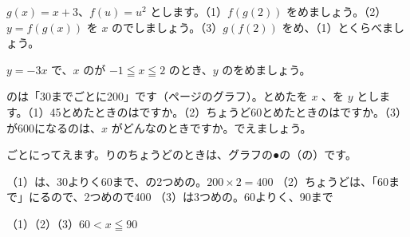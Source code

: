 \begingroup{}%
\noindent\begin{minipage}[t]{0.49\linewidth}
\begin{jibun}
$g(x)=x+3$、$f(u)=u^2$ とします。（1）$f(g(2))$ をめましょう。（2）$y=f(g(x))$ を $x$ のでしましょう。（3）$g(f(2))$ をめ、（1）とくらべましょう。
\end{jibun}
\end{minipage}\hfill
\begin{minipage}[t]{0.49\linewidth}
\begin{jibun}
$y=-3x$ で、$x$ のが $-1\leqq x\leqq2$ のとき、$y$ のをめましょう。
\end{jibun}
\end{minipage}\par
\endgroup

\begin{reidai}[\R{階段}{かい|だん}の\R{関数}{かん|すう}を\R{読}{よ}む]
のは「30までごとに200」です（\pageref{bk:3-3:kaidan}ページのグラフ）。とめたを $x$ 、を $y$ とします。（1）45とめたときのはですか。（2）ちょうど60とめたときのはですか。（3）が600になるのは、$x$ がどんなのときですか。でえましょう。\par
{}ごとにってえます。りのちょうどのときは、グラフの●の（の）です。\par
\bkthrdSi（1）は、30よりく60まで、の2つめの。$200\times2=400$
\bkthrdI（2）ちょうどは、「60まで」にるので、2つめので400
\bkthrdI（3）は3つめの。60よりく、90まで\par
\bkthrdK（1）\quad（2）\quad（3）\nobreak $60<x\leqq90$
\end{reidai}

